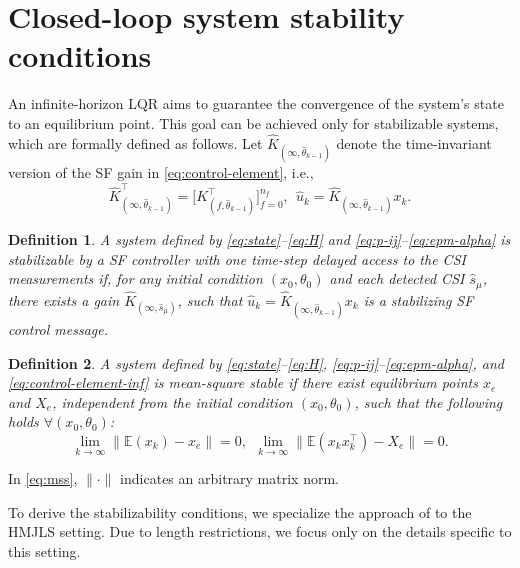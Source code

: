 \documentclass[journal,twoside,web]{ieeecolor}
\newtheorem{definition}{Definition}
\begin{document}
\section{Closed-loop system stability conditions}\label{sec:stability}
An infinite-horizon LQR aims to guarantee the convergence of the system's state to an equilibrium point. This goal can be achieved only for stabilizable systems, which are formally defined as follows. Let $\hat{K}_{(\infty,\hat{\theta}_{k-1})}$ denote the time-invariant version of the SF gain in \eqref{eq:control-element}, i.e.,
\begin{equation}\label{eq:control-element-inf}
	\hat{K}_{(\infty,\hat{\theta}_{k-1})}^{\top} = \big[K_{(f,\hat{\theta}_{k-1})}^{\top}\big]_{f=0}^{n_f},~~
    \hat{u}_{k}=\hat{K}_{(\infty,\hat{\theta}_{k-1})}x_k.
\end{equation}
\begin{definition}\label{def:stabiliz} 
A system defined by \eqref{eq:state}--\eqref{eq:H} and \eqref{eq:p-ij}--\eqref{eq:epm-alpha} is stabilizable by %
a SF controller with one time-step delayed access to the CSI measurements 
if, for any initial condition $(x_0,\theta_0)$ and each detected CSI $\hat{s}_{\mu}$, there exists a gain $\hat{K}_{(\infty,\hat{s}_{\mu})}$, such that  $\hat{u}_{k}=\hat{K}_{(\infty,\hat{\theta}_{k-1})}x_k$ is a stabilizing SF control message. %
\end{definition}
\begin{definition}\label{def:mss}
A system defined by \eqref{eq:state}--\eqref{eq:H}, \eqref{eq:p-ij}--\eqref{eq:epm-alpha}, and \eqref{eq:control-element-inf}
is mean-square stable if there exist equilibrium points $x_{e}$ and $X_{e}$, independent from the initial condition $(x_0,\theta_0)$, such that the following holds $\forall (x_0,\theta_0)$:
\begin{equation}\label{eq:mss}
        \lim_{k \to \infty} \|\mathbb{E} (x_k)-x_{e} \| = 0,~~
        \lim_{k \to \infty} \|\mathbb{E} (x_k x_k^{\top} )-X_{e}\| = 0.
\end{equation}
\end{definition}
In \eqref{eq:mss}, $\|\cdot\|$ indicates an arbitrary matrix norm.

To derive the stabilizability conditions, we specialize the approach of \cite[Sec. 5]{yZL-2025-automatica} to the HMJLS setting. Due to length restrictions, we focus only on the details specific to this setting.
\end{document}
